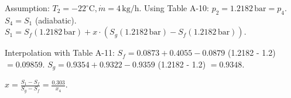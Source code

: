 Assumption: \( T_2 = -22^\circ \text{C}, \dot{m} = 4 \, \text{kg/h} \).  
Using Table A-10: \( p_2 = 1.2182 \, \text{bar} = p_4 \).  
\( S_4 = S_1 \) (adiabatic).  
\( S_1 = S_f (1.2182 \, \text{bar}) + x \cdot (S_g (1.2182 \, \text{bar}) - S_f (1.2182 \, \text{bar})) \).  

Interpolation with Table A-11:  
\( S_f = 0.0873 + 0.4055 - 0.0879 \) (1.2182 - 1.2)  
\( = 0.09859 \).  
\( S_g = 0.9354 + 0.9322 - 0.9359 \) (1.2182 - 1.2)  
\( = 0.9348 \).  

\( x = \frac{S_1 - S_f}{S_g - S_f} = \frac{0.303}{x_4} \).